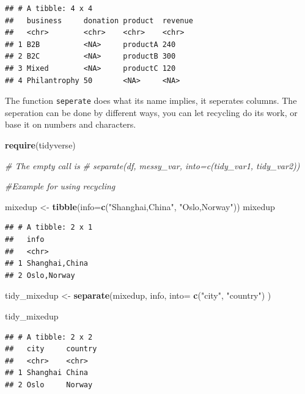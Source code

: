 \documentclass[]{report}
\newenvironment{Shaded}{\begin{snugshade}}{\end{snugshade}}
\newcommand{\KeywordTok}[1]{\textcolor[rgb]{0.13,0.29,0.53}{\textbf{#1}}}
\newcommand{\DataTypeTok}[1]{\textcolor[rgb]{0.13,0.29,0.53}{#1}}
\newcommand{\StringTok}[1]{\textcolor[rgb]{0.31,0.60,0.02}{#1}}
\newcommand{\CommentTok}[1]{\textcolor[rgb]{0.56,0.35,0.01}{\textit{#1}}}
\newcommand{\NormalTok}[1]{#1}
\begin{document}
\begin{verbatim}
## # A tibble: 4 x 4
##   business     donation product  revenue
##   <chr>        <chr>    <chr>    <chr>  
## 1 B2B          <NA>     productA 240    
## 2 B2C          <NA>     productB 300    
## 3 Mixed        <NA>     productC 120    
## 4 Philantrophy 50       <NA>     <NA>
\end{verbatim}

The function \texttt{seperate} does what its name implies, it seperates
columns. The seperation can be done by different ways, you can let
recycling do its work, or base it on numbers and characters.

\begin{Shaded}
\begin{Highlighting}[]
\KeywordTok{require}\NormalTok{(tidyverse)}

\CommentTok{# The empty call is}
\CommentTok{# separate(df, messy_var, into=c(tidy_var1, tidy_var2))}

\CommentTok{#Example for using recycling}

\NormalTok{mixedup <-}\StringTok{ }\KeywordTok{tibble}\NormalTok{(}\DataTypeTok{info=}\KeywordTok{c}\NormalTok{(}\StringTok{"Shanghai,China"}\NormalTok{, }\StringTok{"Oslo,Norway"}\NormalTok{))}
\NormalTok{mixedup}
\end{Highlighting}
\end{Shaded}

\begin{verbatim}
## # A tibble: 2 x 1
##   info          
##   <chr>         
## 1 Shanghai,China
## 2 Oslo,Norway
\end{verbatim}

\begin{Shaded}
\begin{Highlighting}[]
\NormalTok{tidy_mixedup <-}\StringTok{ }\KeywordTok{separate}\NormalTok{(mixedup,}
\NormalTok{                          info,}
                          \DataTypeTok{into=} \KeywordTok{c}\NormalTok{(}\StringTok{"city"}\NormalTok{, }\StringTok{"country"}\NormalTok{)}
\NormalTok{                          )}

\NormalTok{tidy_mixedup}
\end{Highlighting}
\end{Shaded}

\begin{verbatim}
## # A tibble: 2 x 2
##   city     country
##   <chr>    <chr>  
## 1 Shanghai China  
## 2 Oslo     Norway
\end{verbatim}
\end{document}
